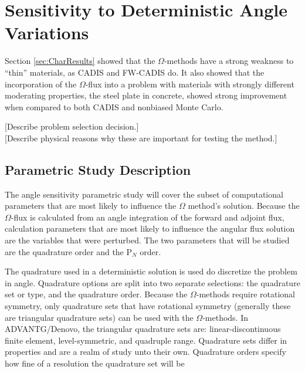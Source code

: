 \section{Sensitivity to Deterministic Angle Variations}
\label{sec:AngleResults}

Section \ref{sec:CharResults} showed that the $\Omega$-methods have a strong
weakness to ``thin'' materials, as CADIS and FW-CADIS do. It also showed that
the incorporation of the $\Omega$-flux into a problem with materials with
strongly different moderating properties, the steel plate in concrete, showed
strong improvement when compared to both CADIS and nonbiased Monte Carlo.

[Describe problem selection decision.] \\

[Describe physical reasons why these are important for testing the method.] \\

\subsection{Parametric Study Description}
\label{subsec:parstudy}

The angle sensitivity parametric study will cover the subset of computational parameters
that are most likely to influence the $\Omega$ method's solution. Because the
$\Omega$-flux is calculated from an angle integration of the forward and adjoint
flux, calculation parameters that are most likely to influence the angular flux
solution are the variables that were perturbed.
The two parameters that will be studied
are the quadrature order and the P$_N$ order.

The quadrature used in a deterministic solution is used do discretize the
problem in angle. Quadrature options are split into two separate selections: the
quadrature set or type, and the quadrature order. Because the $\Omega$-methods
require rotational symmetry, only quadrature sets that have rotational
symmetry (generally these are triangular quadrature sets)
can be used with the $\Omega$-methods. In ADVANTG/Denovo, the triangular
quadrature sets are: linear-discontinuous finite element, level-symmetric, and
quadruple range. Quadrature sets differ in
properties and are a realm of study unto their own. Quadrature orders specify
how fine of a resolution the quadrature set will be

